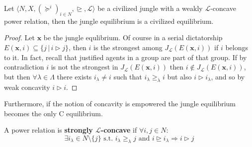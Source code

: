 
\begin{proposition}\label{Prop: undivisible, weakly concave L}
    Let $\langle N,X,(\succeq^i)_{i\in N}, \trianglerighteq, \mathcal{L}\rangle$ be a civilized jungle with a weakly $\mathcal{L}$-concave power relation, then the jungle equilibrium is a civilized equilibrium.

    \begin{proof}
        Let $\textbf{x}$ be the jungle equlibrium. Of course in a serial dictatorship $E(\textbf{x},i)\subseteq\{j\,|\,i\triangleright j\}$, then $i$ is the strongest among $J_{\mathcal{L}}(E(\textbf{x},i))$ if $i$ belongs to it. In fact, recall that justified agents in a group are part of that group. If by contradiction $i$ is not the strongest in $J_{\mathcal{L}}(E(\textbf{x},i))$ then $i\notin J_{\mathcal{L}}(E(\textbf{x},i))$, but then $\forall\lambda\in\Lambda$ there exists $i_{\lambda}\neq i$ such that $i_{\lambda}\geq_{\lambda}i$ but also $i\triangleright i_{\lambda}$, and so by weak concavity $i\triangleright i$.   
    \end{proof}
\end{proposition}




Furthermore, if the notion of concavity is empowered the jungle equilibrium becomes the only C equilibrium.

\begin{definition}
    A power relation is \textbf{strongly $\mathcal{L}$-concave} if $\forall i,j\in N$:
    \[\exists i_{\lambda}\in N\setminus\{j\}\text{ s.t. }i_{\lambda}\geq_{\lambda}j\text{ and }i\trianglerighteq i_{\lambda}\Rightarrow i\triangleright j\]
\end{definition}

